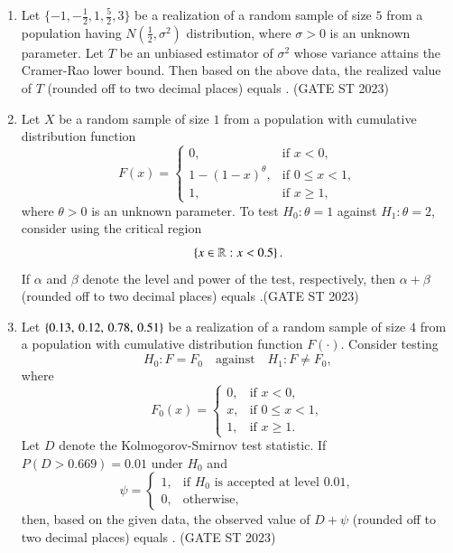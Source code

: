 \documentclass[journal]{IEEEtran}
\begin{document}
\begin{enumerate}[label=\textbf{Q.\arabic*.}, start=11, align=left, itemsep=2em]
\item Let $\{-1, -\frac{1}{2}, 1, \frac{5}{2}, 3\}$ be a realization of a random sample of size $5$ from a population having $N\left(\frac12, \sigma^2\right)$ distribution, where $\sigma > 0$ is an unknown parameter. Let $T$ be an unbiased estimator of $\sigma^2$ whose variance attains the Cramer-Rao lower bound. Then based on the above data, the realized value of $T$ (rounded off to two decimal places) equals \underline{\hspace{2cm}}.
\hfill(GATE ST 2023)

\item Let $X$ be a random sample of size $1$ from a population with cumulative distribution function  
\[
F(x) =
\begin{cases}
0, & \text{if } x < 0, \\
1 - (1-x)^{\theta}, & \text{if } 0 \le x < 1, \\
1, & \text{if } x \ge 1,
\end{cases}
\]
where $\theta > 0$ is an unknown parameter.  
To test $H_0: \theta = 1$ against $H_1: \theta = 2$, consider using the critical region  
\[
\left\{x \in \mathbb{R} : x < 0.5\right\}.
\]  
If $\alpha$ and $\beta$ denote the level and power of the test, respectively, then $\alpha + \beta$ (rounded off to two decimal places) equals \underline{\hspace{2cm}}.\hfill(GATE ST 2023)

\item Let $\left\{0.13,\, 0.12,\, 0.78,\, 0.51\right\}$ be a realization of a random sample of size $4$ from a population with cumulative distribution function $F(\cdot)$. Consider testing  
\[
H_0: F = F_0 \quad \text{against} \quad H_1: F \neq F_0,
\]
where  
\[
F_0(x) =
\begin{cases}
0, & \text{if } x < 0, \\
x, & \text{if } 0 \le x < 1, \\
1, & \text{if } x \ge 1.
\end{cases}
\]
Let $D$ denote the Kolmogorov-Smirnov test statistic. If $P(D > 0.669) = 0.01$ under $H_0$ and  
\[
\psi =
\begin{cases}
1, & \text{if $H_0$ is accepted at level $0.01$}, \\
0, & \text{otherwise},
\end{cases}
\]
then, based on the given data, the observed value of $D + \psi$ (rounded off to two decimal places) equals \underline{\hspace{2cm}}.
\hfill(GATE ST 2023)

\end{enumerate}
\end{document}
